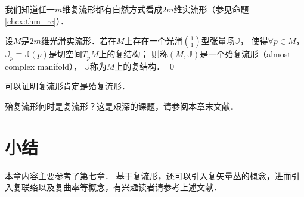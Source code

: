 我们知道任一$m$维复流形都有自然方式看成$2m$维实流形（参见命题\ref{chcx:thm_rc}）．



\begin{definition}\label{chcx:def_acm}
    设$M$是$2m$维光滑实流形．若在$M$上存在一个光滑$\binom{1}{1}$型张量场$\mathbb{J}$，
    使得$\forall p\in M$，$\mathbb{J}_p\equiv \mathbb{J}(p)$是切空间$T_p M$上的复结构；
    则称$(M,\mathbb{J})$是一个{\heiti 殆复流形}（almost complex manifold），
    $\mathbb{J}$称为$M$上的{\heiti 复结构}． \qed
\end{definition}

可以证明复流形肯定是殆复流形．

殆复流形何时是复流形？这是艰深的课题，请参阅本章末文献．




\section*{小结}
本章内容主要参考了\parencite{cc2001-zh}第七章． %
基于复流形，还可以引入复矢量丛的概念，进而引入复联络以及复曲率等概念，有兴趣读者请参考上述文献．

\printbibliography[heading=subbibliography,title=第\ref{chcx}章参考文献]

\endinput











